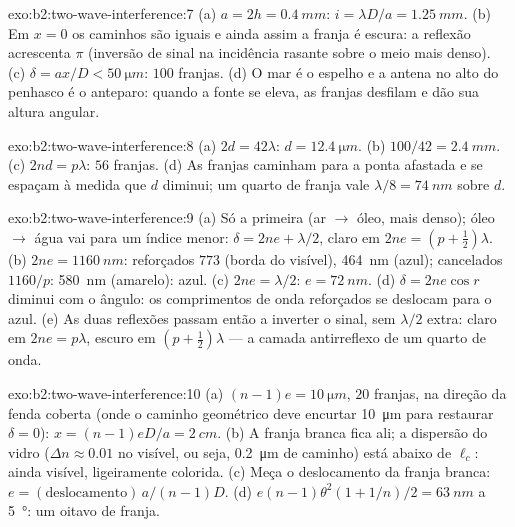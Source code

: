 \begin{solution}{exo:b2:two-wave-interference:7}
(a) $a = 2h = \qty{0.4}{mm}$: $i = \lambda D/a = \qty{1.25}{mm}$. (b) Em $x = 0$ os caminhos
são iguais e ainda assim a franja é escura: a reflexão acrescenta $\pi$ (inversão
de sinal na incidência rasante sobre o meio mais denso). (c) $\delta = ax/D <
\qty{50}{\micro m}$: $100$ franjas. (d) O mar é o espelho e a antena no alto do
penhasco é o anteparo: quando a fonte se eleva, as franjas desfilam e
dão sua altura angular.
\end{solution}

\begin{solution}{exo:b2:two-wave-interference:8}
(a) $2d = 42\lambda$: $d = \qty{12.4}{\micro m}$. (b) $100/42 = \qty{2.4}{mm}$. (c) $2nd = p\lambda$:
$56$ franjas. (d) As franjas caminham para a ponta afastada e se espaçam à medida que $d$
diminui; um quarto de franja vale $\lambda/8 = \qty{74}{nm}$ sobre $d$.
\end{solution}

\begin{solution}{exo:b2:two-wave-interference:9}
(a) Só a primeira (ar $\to$ óleo, mais denso); óleo $\to$ água vai para um índice
menor: $\delta = 2ne + \lambda/2$, claro em $2ne = (p + \tfrac12)\lambda$. (b) $2ne =
\qty{1160}{nm}$: reforçados $773$ (borda do visível), \qty{464}{nm} (azul);
cancelados $1160/p$: \qty{580}{nm} (amarelo): azul. (c) $2ne = \lambda/2$: $e = \qty{72}{nm}$.
(d) $\delta = 2ne\cos r$ diminui com o ângulo: os comprimentos de onda reforçados
se deslocam para o azul. (e) As duas reflexões passam então a inverter o sinal, sem
$\lambda/2$ extra: claro em $2ne = p\lambda$, escuro em $(p + \tfrac12)\lambda$ --- a
camada antirreflexo de um quarto de onda.
\end{solution}

\begin{solution}{exo:b2:two-wave-interference:10}
(a) $(n - 1)e = \qty{10}{\micro m}$, $20$ franjas, na direção da fenda coberta (onde
o caminho geométrico deve encurtar \qty{10}{\micro m} para restaurar $\delta = 0$):
$x = (n - 1)eD/a = \qty{2}{cm}$. (b) A franja branca fica ali; a
dispersão do vidro ($\Delta n \approx 0.01$ no visível, ou seja, \qty{0.2}{\micro m} de caminho)
está abaixo de $\ell_c$: ainda visível, ligeiramente colorida. (c) Meça o
deslocamento da franja branca: $e = (\text{deslocamento})\,a/(n - 1)D$. (d) $e(n - 1)\theta^2
(1 + 1/n)/2 = \qty{63}{nm}$ a \qty{5}{\degree}: um oitavo de franja.
\end{solution}

